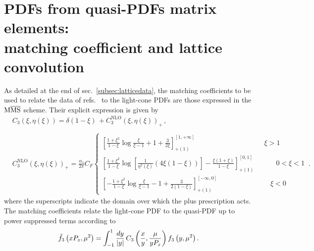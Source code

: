 \chapter{PDFs from quasi-PDFs matrix elements: \\
matching coefficient and lattice convolution}
\label{app:coefficients}
As detailed at the end of sec.~\ref{subsec:latticedata}, the matching coefficients to be
used to relate the data of refs.~\cite{Alexandrou:2018pbm,Alexandrou:2019lfo} to the light-cone PDFs
are those expressed in the ${\rm M}\overline{\mathrm{MS}}$ scheme. Their explicit expression is given
by \cite{Alexandrou:2018pbm,Alexandrou:2019lfo}
\begin{equation}
	\label{eq::matching}
	\begin{split}
		&C_{3}\left(\xi,\eta\left(\xi\right) \right)= \delta\left(1-\xi\right)\, +  C_{3}^{\text{NLO}}\left(\xi,\eta\left(\xi\right) \right)_+\,,  \\ \\ 
		& C_{3}^{\text{NLO}}\left(\xi,\eta\left(\xi\right) \right)_+ =  \frac{\alpha_s}{2\pi}C_F \begin{cases} \left[\frac{1+\xi^2}{1-\xi}\log{\frac{\xi}{\xi-1}} + 1 + \frac{3}{2\xi}\right]^{\left[1,+\infty\right]}_{+(1)} \,\,\,\,\,\,\,\,\,\,\,\,\,\,\,\,\,\,\,\,\,\,\,\,\,\,\,\,\,\,\,\,\,\,\,\,\,\,\,\,\,\,\,\,\,\,\,\,\,\,\,\,\,\,\,\,\,\,\,\, \xi > 1\\ \left[\frac{1+\xi^2}{1-\xi}\log\left[{\frac{1}{\eta^2\left(\xi\right)}}\left(4\xi\left(1-\xi\right)\right)\right]  -\frac{\xi\left(1+\xi\right)}{1-\xi}\right]^{\left[0,1\right]}_{+(1)}\,\,\,\,\,\,\,\,\,\,\,\,\,\,\,\,\,\,\, 0<\xi < 1 \\ \left[-\frac{1+\xi^2}{1-\xi}\log{\frac{\xi}{\xi-1}} - 1 + \frac{3}{2\left(1-\xi\right)}\right]^{\left[-\infty,0\right]}_{+(1)} \,\,\,\,\,\,\,\,\,\,\,\,\,\,\,\,\,\,\,\,\,\,\,\,\,\,\,\,\,\,\,\,\,\,\,\,\,\,\,\,\,\,\,\,\,\, \xi<0\end{cases}\, .
	\end{split}
\end{equation}
where the superscripts indicate the domain over which the plus prescription acts.
The matching coefficients relate the light-cone PDF to the quasi-PDF up to power suppressed terms
according to
\begin{align}
	\label{eq::matchingfud}                                   
	\tilde{f}_{3}\left( x P_z, {\mu}^2 \right) =              
	\int_{-1}^{1} \frac{dy}{|y|}\, C_{3}\left(\frac{x}{y},\frac{\mu}{y P_z}\right)  
	f_{3}\left( y, {\mu}^2\right). 
\end{align}
